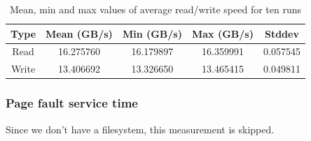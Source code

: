 \begin{table}[htb]
\caption{Mean, min and max values of average read/write speed for ten runs}
\begin{tabular}{|c|c|c|c|c|} 
    \hline
    Type & Mean (GB/s) & Min (GB/s)& Max (GB/s)& Stddev\\ 
    \hline
    Read & 16.275760& 16.179897 & 16.359991 & 0.057545\\
    \hline
    Write & 13.406692 & 13.326650 & 13.465415 & 0.049811\\ 
    \hline
   \end{tabular}
    \label{tab:t6}
\end{table}

\subsubsection{Page fault service time}
Since we don't have a filesystem, this measurement is skipped.